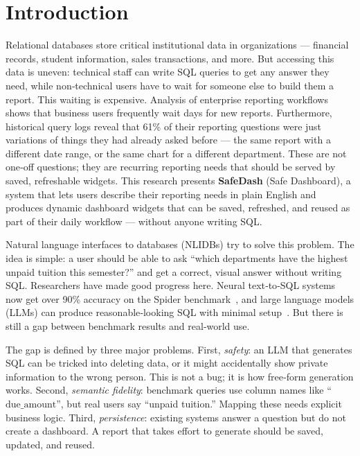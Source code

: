\documentclass[11pt]{article}
\begin{document}
\section{Introduction}
Relational databases store critical institutional data in organizations --- financial records, student information, sales transactions, and more. But accessing this data is uneven: technical staff can write SQL queries to get any answer they need, while non‑technical users have to wait for someone else to build them a report. This waiting is expensive. Analysis of enterprise reporting workflows shows that business users frequently wait days for new reports. Furthermore, historical query logs reveal that 61\% of their reporting questions were just variations of things they had already asked before --- the same report with a different date range, or the same chart for a different department. These are not one‑off questions; they are recurring reporting needs that should be served by saved, refreshable widgets. This research presents \textbf{SafeDash} (Safe Dashboard), a system that lets users describe their reporting needs in plain English and produces dynamic dashboard widgets that can be saved, refreshed, and reused as part of their daily workflow --- without anyone writing SQL.

Natural language interfaces to databases (NLIDBs) try to solve this problem. The idea is simple: a user should be able to ask ``which departments have the highest unpaid tuition this semester?'' and get a correct, visual answer without writing SQL. Researchers have made good progress here. Neural text‑to‑SQL systems now get over 90\% accuracy on the Spider benchmark~\cite{yu2018spider}, and large language models (LLMs) can produce reasonable‑looking SQL with minimal setup~\cite{li2023bigbench}. But there is still a gap between benchmark results and real‑world use.

The gap is defined by three major problems. First, \emph{safety}: an LLM that generates SQL can be tricked into deleting data, or it might accidentally show private information to the wrong person. This is not a bug; it is how free‑form generation works. Second, \emph{semantic fidelity}: benchmark queries use column names like ``$\mathrm{due\_amount}$'', but real users say ``unpaid tuition.'' Mapping these needs explicit business logic. Third, \emph{persistence}: existing systems answer a question but do not create a dashboard. A report that takes effort to generate should be saved, updated, and reused.
\end{document}
